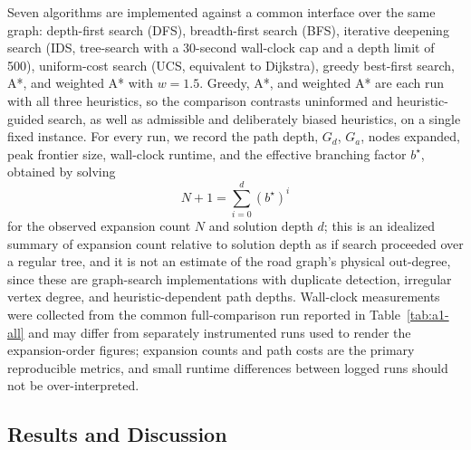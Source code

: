 \documentclass{ai-lab-report}
\begin{document}
Seven algorithms are implemented against a common interface over the same graph: depth-first search (DFS), breadth-first search (BFS), iterative deepening search (IDS, tree-search with a 30-second wall-clock cap and a depth limit of 500), uniform-cost search (UCS, equivalent to Dijkstra), greedy best-first search, A*, and weighted A* with $w=1.5$. Greedy, A*, and weighted A* are each run with all three heuristics, so the comparison contrasts uninformed and heuristic-guided search, as well as admissible and deliberately biased heuristics, on a single fixed instance. For every run, we record the path depth, $G_d$, $G_a$, nodes expanded, peak frontier size, wall-clock runtime, and the effective branching factor $b^\star$, obtained by solving
\begin{equation}
N+1=\sum_{i=0}^{d}(b^\star)^i
\label{eq:a1-branching-factor}
\end{equation}
for the observed expansion count $N$ and solution depth $d$; this is an idealized summary of expansion count relative to solution depth as if search proceeded over a regular tree, and it is not an estimate of the road graph's physical out-degree, since these are graph-search implementations with duplicate detection, irregular vertex degree, and heuristic-dependent path depths. Wall-clock measurements were collected from the common full-comparison run reported in Table~\ref{tab:a1-all} and may differ from separately instrumented runs used to render the expansion-order figures; expansion counts and path costs are the primary reproducible metrics, and small runtime differences between logged runs should not be over-interpreted.

\subsection{Results and Discussion}
\end{document}

